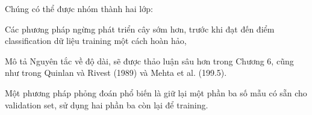 Chúng có thể được nhóm thành hai lớp:

Các phương pháp ngừng phát triển cây sớm hơn, trước khi đạt đến điểm classification dữ liệu training một cách hoàn hảo,

Mô tả Nguyên tắc về độ dài, sẽ được thảo luận sâu hơn trong Chương 6, cũng như trong Quinlan và Rivest (1989) và Mehta et al. (199.5).

Một phương pháp phỏng đoán phổ biến là giữ lại một phần ba số mẫu có sẵn cho validation set, sử dụng hai phần ba còn lại để training.

